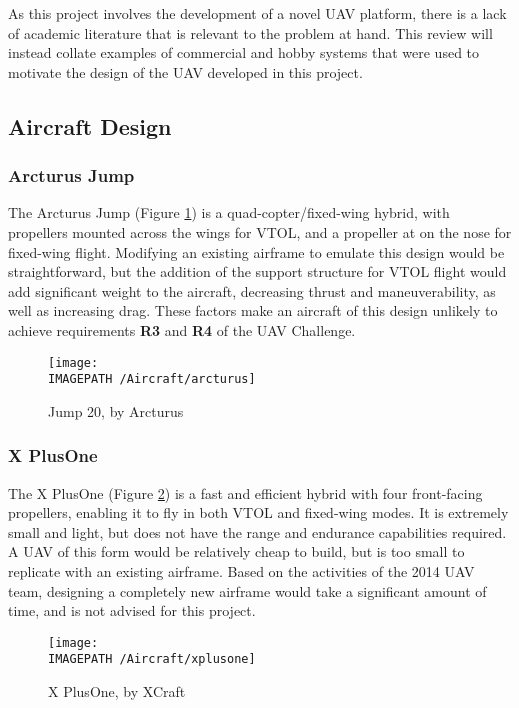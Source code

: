 As this project involves the development of a novel UAV platform, there is a lack of academic literature that is relevant to the problem at hand. This review will instead collate examples of commercial and hobby systems that were used to motivate the design of the UAV developed in this project.\\

\subsection{Aircraft Design}
\label{sec:litaircraft}
\subsubsection*{Arcturus Jump}
The Arcturus Jump \cite{ref:arcturus} (Figure \ref{fig:arcturus}) is a quad-copter/fixed-wing hybrid, with propellers mounted across the wings for VTOL, and a propeller at on the nose for fixed-wing flight. Modifying an existing airframe to emulate this design would be straightforward, but the addition of the support structure for VTOL flight would add significant weight to the aircraft, decreasing thrust and maneuverability, as well as increasing drag. These factors make an aircraft of this design unlikely to achieve requirements \textbf{R3} and \textbf{R4} of the UAV Challenge.

\begin{figure}[!h]
	\centering
	\texttt{[image: \\IMAGEPATH /Aircraft/arcturus]}
	\caption{Jump 20, by Arcturus}
	\label{fig:arcturus}
\end{figure}

\subsubsection*{X PlusOne}
The X PlusOne \cite{ref:xplusone} (Figure \ref{fig:xplusone}) is a fast and efficient hybrid with four front-facing propellers, enabling it to fly in both VTOL and fixed-wing modes. It is extremely small and light, but does not have the range and endurance capabilities required. A UAV of this form would be relatively cheap to build, but is too small to replicate with an existing airframe. Based on the activities of the 2014 UAV team, designing a completely new airframe would take a significant amount of time, and is not advised for this project.

\begin{figure}[!ht]
	\centering
	\texttt{[image: \\IMAGEPATH /Aircraft/xplusone]}
	\caption{X PlusOne, by XCraft}
	\label{fig:xplusone}
\end{figure}

